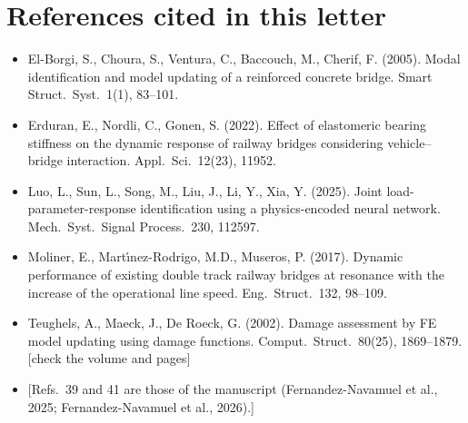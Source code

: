 \documentclass[11pt]{article}
\newcommand{\tbd}[1]{\textcolor{note}{\textsf{[#1]}}}
\begin{document}
\section{References cited in this letter}
{\small
\begin{itemize}[leftmargin=*,label={}]
\item El-Borgi, S., Choura, S., Ventura, C., Baccouch, M., Cherif, F. (2005). Modal identification and model updating of a reinforced concrete bridge. Smart Struct.\ Syst.\ 1(1), 83--101.
\item Erduran, E., Nordli, C., Gonen, S. (2022). Effect of elastomeric bearing stiffness on the dynamic response of railway bridges considering vehicle--bridge interaction. Appl.\ Sci.\ 12(23), 11952.
\item Luo, L., Sun, L., Song, M., Liu, J., Li, Y., Xia, Y. (2025). Joint load-parameter-response identification using a physics-encoded neural network. Mech.\ Syst.\ Signal Process.\ 230, 112597.
\item Moliner, E., Mart\'{\i}nez-Rodrigo, M.D., Museros, P. (2017). Dynamic performance of existing double track railway bridges at resonance with the increase of the operational line speed. Eng.\ Struct.\ 132, 98--109.
\item Teughels, A., Maeck, J., De Roeck, G. (2002). Damage assessment by FE model updating using damage functions. Comput.\ Struct.\ 80(25), 1869--1879. \tbd{check the volume and pages}
\item \tbd{Refs.~39 and 41 are those of the manuscript (Fernandez-Navamuel et al., 2025; Fernandez-Navamuel et al., 2026).}
\end{itemize}
}
\end{document}
